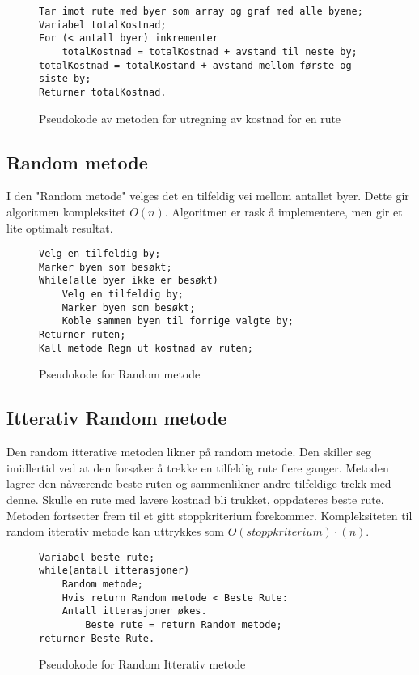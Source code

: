 \documentclass[12pt]{article}
\begin{document}

\begin{figure}[h]
	\begin{lstlisting}[frame=single]
Tar imot rute med byer som array og graf med alle byene;
Variabel totalKostnad;
For (< antall byer) inkrementer
	totalKostnad = totalKostnad + avstand til neste by;
totalKostnad = totalKostand + avstand mellom første og siste by;
Returner totalKostnad. 
	\end{lstlisting}
	\caption{Pseudokode av metoden for utregning av kostnad for en rute}
\end{figure}


\subsection{Random metode}
		I den "Random metode" velges det en tilfeldig vei mellom antallet byer. Dette gir algoritmen kompleksitet
		$O(n)$. Algoritmen er rask å implementere, men gir et lite optimalt resultat. \\


\begin{figure}[h]
	\begin{lstlisting}[frame=single]
Velg en tilfeldig by;
Marker byen som besøkt;
While(alle byer ikke er besøkt)
	Velg en tilfeldig by;
	Marker byen som besøkt;
	Koble sammen byen til forrige valgte by;
Returner ruten;
Kall metode Regn ut kostnad av ruten;
	\end{lstlisting}
	\caption{Pseudokode for Random metode}
\end{figure}


\newpage
\subsection{Itterativ Random metode}				

		Den random itterative metoden likner på random metode. Den skiller seg imidlertid ved at den forsøker å trekke en tilfeldig rute flere ganger. Metoden lagrer den nåværende beste ruten og sammenlikner andre tilfeldige trekk med denne. Skulle en rute med lavere kostnad bli trukket, oppdateres beste rute. Metoden
		fortsetter frem til et gitt stoppkriterium forekommer. Kompleksiteten til random itterativ metode kan uttrykkes som $O(stoppkriterium)\cdot(n)$. \\

\begin{figure}[h]
	\begin{lstlisting}[frame=single]
Variabel beste rute;
while(antall itterasjoner)
	Random metode;
	Hvis return Random metode < Beste Rute:
	Antall itterasjoner økes.
		Beste rute = return Random metode;
returner Beste Rute.
	\end{lstlisting}
	\caption{Pseudokode for Random Itterativ metode}
\end{figure}
\end{document}
